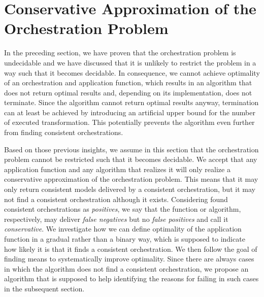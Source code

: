 \section{Conservative Approximation of the Orchestration Problem}

In the preceding section, we have proven that the orchestration problem is undecidable and we have discussed that it is unlikely to restrict the problem in a way such that it becomes decidable.
In consequence, we cannot achieve optimality of an orchestration and application function, which results in an 
algorithm that does not return optimal results and, depending on its implementation, does not terminate.
Since the algorithm cannot return optimal results anyway, termination can at least be achieved by introducing an artificial upper bound for the number of executed transformation.
This potentially prevents the algorithm even further from finding consistent orchestrations.

Based on those previous insights, we assume in this section that the orchestration problem cannot be restricted such that it becomes decidable.
We accept that any application function and any algorithm that realizes it will only realize a conservative approximation of the orchestration problem.
This means that it may only return consistent models delivered by a consistent orchestration, but it may not find a consistent orchestration although it exists.
Considering found consistent orchestrations as \emph{positives}, we say that the function or algorithm, respectively, may deliver \emph{false negatives} but no \emph{false positives} and call it \emph{conservative}.
We investigate how we can define optimality of the application function in a gradual rather than a binary way, which is supposed to indicate how likely it is that it finds a consistent orchestration.
We then follow the goal of finding means to systematically improve optimality.
Since there are always cases in which the algorithm does not find a consistent orchestration, we propose an algorithm that is supposed to help identifying the reasons for failing in such cases in the subsequent section.


